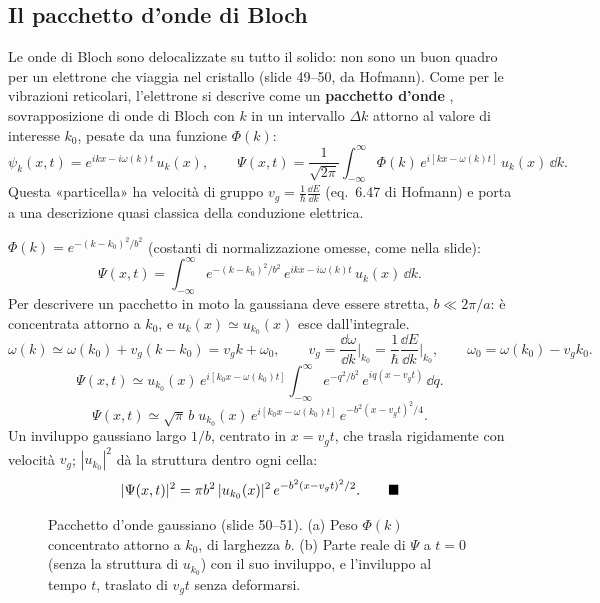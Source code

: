 \documentclass[11pt,a4paper]{article}
\begin{document}
\subsection{Il pacchetto d'onde di Bloch}\label{sec:pacchetto}
Le onde di Bloch sono delocalizzate su tutto il solido: non sono un buon quadro per un elettrone che viaggia nel cristallo (slide 49--50, da Hofmann).
Come per le vibrazioni reticolari, l'elettrone si descrive come un \textbf{pacchetto d'onde} , sovrapposizione di onde di Bloch
con $k$ in un intervallo $\Delta k$ attorno al valore di interesse $k_0$, pesate da una funzione $\Phi(k)$:
\[
\psi_k(x,t)=e^{ikx-i\omega(k)t}\,u_k(x),\qquad
\Psi(x,t)=\frac1{\sqrt{2\pi}}\int_{-\infty}^{\infty}\Phi(k)\,e^{i[kx-\omega(k)t]}\,u_k(x)\,\dd k .
\]
Questa «particella» ha velocità di gruppo $v_g=\frac1\hbar\frac{\dd E}{\dd k}$ (eq.~6.47 di Hofmann) e porta a una descrizione quasi classica della
conduzione elettrica.

\begin{dimostrazione}
$\Phi(k)=e^{-(k-k_0)^2/b^2}$ (costanti di normalizzazione omesse, come nella slide):
\[
\Psi(x,t)=\int_{-\infty}^{\infty}e^{-(k-k_0)^2/b^2}\,e^{ikx-i\omega(k)t}\,u_k(x)\,\dd k .
\]
Per descrivere un pacchetto in moto la gaussiana deve essere stretta, $b\ll2\pi/a$: è concentrata attorno a $k_0$, e $u_k(x)\simeq u_{k_0}(x)$ esce
dall'integrale.
\[
\omega(k)\simeq\omega(k_0)+v_g(k-k_0)=v_gk+\omega_0,\qquad v_g=\frac{\dd\omega}{\dd k}\Big|_{k_0}=\frac1\hbar\frac{\dd E}{\dd k}\Big|_{k_0},
\qquad\omega_0=\omega(k_0)-v_gk_0 .
\]
\[
\Psi(x,t)\simeq u_{k_0}(x)\,e^{i[k_0x-\omega(k_0)t]}\int_{-\infty}^{\infty}e^{-q^2/b^2}\,e^{iq(x-v_gt)}\,\dd q .
\]
\[
\Psi(x,t)\simeq\sqrt\pi\,b\;u_{k_0}(x)\,e^{i[k_0x-\omega(k_0)t]}\,e^{-b^2(x-v_gt)^2/4}.
\]
Un inviluppo gaussiano largo $1/b$, centrato in $x=v_gt$, che trasla rigidamente con velocità $v_g$; $|u_{k_0}|^2$ dà la struttura dentro ogni cella:
\[
|\Psi(x,t)|^2=\pi b^2\,|u_{k_0}(x)|^2\,e^{-b^2(x-v_gt)^2/2}.\qed
\]
\end{dimostrazione}

\begin{figure}[tbp]
\centering
{}
\caption{Pacchetto d'onde gaussiano (slide 50--51). (a) Peso $\Phi(k)$ concentrato attorno a $k_0$, di larghezza $b$. (b) Parte reale di $\Psi$ a
$t=0$ (senza la struttura di $u_{k_0}$) con il suo inviluppo, e l'inviluppo al tempo $t$, traslato di $v_gt$ senza deformarsi.}\label{fig:pacchetto}
\end{figure}
\end{document}
